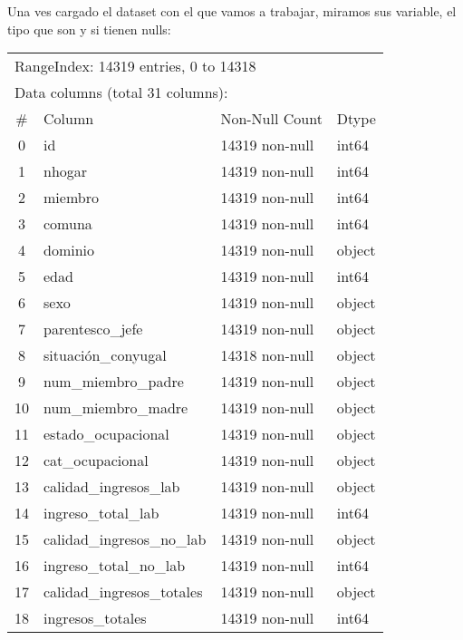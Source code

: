 \documentclass[a4paper]{article}
\begin{document}
    Una ves cargado el dataset con el que vamos a trabajar, miramos sus variable, el tipo que son y si tienen nulls:
    \begin{table}[H]\begin{center}
    \begin{tabular}{clll}
    \multicolumn{4}{l}{RangeIndex: 14319 entries, 0 to 14318} \\
    \multicolumn{4}{l}{Data columns (total 31 columns):}  \\
    \#  & Column                     & Non-Null Count & Dtype \\ \hline
    0  & id                          & 14319 non-null & int64 \\
    1  & nhogar                      & 14319 non-null & int64 \\
    2  & miembro                     & 14319 non-null & int64 \\
    3  & comuna                      & 14319 non-null & int64 \\
    4  & dominio                     & 14319 non-null & object \\
    5  & edad                        & 14319 non-null & int64 \\
    6  & sexo                        & 14319 non-null & object \\
    7  & parentesco\_jefe             & 14319 non-null & object \\
    8  & situación\_conyugal          & 14318 non-null & object \\
    9  & num\_miembro\_padre           & 14319 non-null & object \\
    10 & num\_miembro\_madre           & 14319 non-null & object \\
    11 & estado\_ocupacional          & 14319 non-null & object \\
    12 & cat\_ocupacional             & 14319 non-null & object \\
    13 & calidad\_ingresos\_lab        & 14319 non-null & object \\
    14 & ingreso\_total\_lab           & 14319 non-null & int64  \\
    15 & calidad\_ingresos\_no\_lab     & 14319 non-null & object \\
    16 & ingreso\_total\_no\_lab        & 14319 non-null & int64  \\
    17 & calidad\_ingresos\_totales    & 14319 non-null & object \\
    18 & ingresos\_totales            & 14319 non-null & int64  \\

\end{tabular}
\end{center}
\end{table}
\end{document}
